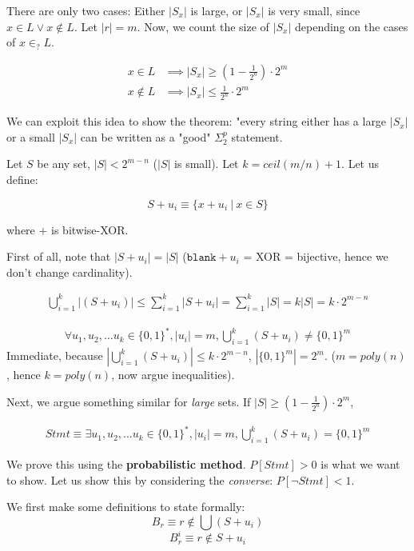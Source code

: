 There are only two cases: Either $|S_x|$ is large, or $|S_x|$ is very small,
since $x \in L \lor x \notin L$.  Let $|r| = m$. Now, we count the size
of $|S_x|$ depending on the cases of $x \in_? L$.


\begin{align*}
    x \in L &\implies |S_x| \geq (1 - \frac{1}{2^n}) \cdot 2^m \\
    x \notin L &\implies |S_x| \leq \frac{1}{2^n} \cdot 2^m
\end{align*}

We can exploit this idea to show the theorem: "every string either has a large
$|S_x|$ or a small $|S_x|$ can be written as a "good" $\Sigma_2^p$ statement.


Let $S$ be any set, $|S|< 2^{m - n}$ ($|S|$ is small). Let $k = ceil(m / n) + 1$.
Let us define:

$$
S + u_i \equiv \{ x + u_i~\vert~x \in S \}
$$

where $+$ is bitwise-XOR.

First of all, note that $|S + u_i| = |S|$ ($\texttt{blank} + u_i$ = XOR = bijective, hence we don't change cardinality).


\begin{align*}
    \bigcup_{i=1}^k |(S + u_i)| \leq \sum_{i=1}^k |S + u_i| = \sum_{i=1}^k |S| = k |S| = k \cdot 2^{m - n}
\end{align*}


\begin{align*}
    \forall u_1, u_2, \dots u_k \in \{0, 1\}^*, |u_i| = m, \bigcup_{i=1}^k (S + u_i) \neq \{0, 1\}^m
\end{align*}
Immediate, because $|\bigcup_{i=1}^k (S + u_i)| \leq k \cdot 2^{m - n}$,
$|\{0, 1\}^m| = 2^m$.  ($m = poly(n)$, hence $k = poly(n)$, now argue inequalities).


Next, we argue something similar for \textit{large} sets. 
If $|S| \geq (1 - \frac{1}{2^n}) \cdot 2^m$,

\begin{align*}
    Stmt \equiv \exists u_1, u_2, \dots u_k \in \{0, 1\}^*, |u_i| = m, \bigcup_{i=1}^k (S + u_i) = \{0, 1\}^m
\end{align*}

We prove this using the \textbf{probabilistic method}.  $P[Stmt] > 0$ is what we want to show.
Let us show this by considering the \textit{converse}: $P[\lnot Stmt] < 1$. 


We first make some definitions to state formally: 
$$B_r \equiv r \notin \bigcup (S + u_i)$$
 $$B_r^i \equiv r \notin S + u_i$$

